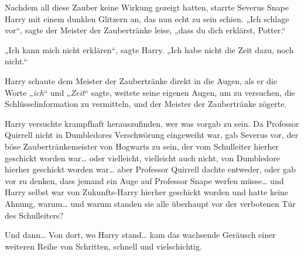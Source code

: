 Nachdem all diese Zauber keine Wirkung gezeigt hatten, starrte Severus Snape Harry mit einem dunklen Glitzern an, das nun echt zu sein schien.
„Ich schlage vor“, sagte der Meister der Zaubertränke leise, „dass du dich erklärst, Potter.“

„Ich kann mich nicht erklären“, sagte Harry. „Ich habe nicht die Zeit dazu, noch nicht.“

Harry schaute dem Meister der Zaubertränke direkt in die Augen, als er die Worte „\emph{ich}“ und „\emph{Zeit}“ sagte, weitete seine eigenen Augen, um zu versuchen, die Schlüsselinformation zu vermitteln, und der Meister der Zaubertränke zögerte.

Harry versuchte krampfhaft herauszufinden, wer was vorgab zu sein. Da Professor Quirrell nicht in Dumbledores Verschwörung eingeweiht war, gab Severus vor, der böse Zaubertränkemeister von Hogwarts zu sein, der vom Schulleiter hierher geschickt worden war… oder vielleicht, vielleicht auch nicht, von Dumbledore hierher geschickt worden war… aber Professor Quirrell dachte entweder, oder gab vor zu denken, dass jemand ein Auge auf Professor Snape werfen müsse… und Harry selbst war von Zukunfts-Harry hierher geschickt worden und hatte keine Ahnung, warum… und warum standen sie alle überhaupt vor der verbotenen Tür des Schulleiters?



Und dann… Von dort, wo Harry stand… kam das wachsende Geräusch einer weiteren Reihe von Schritten, schnell und vielschichtig.

